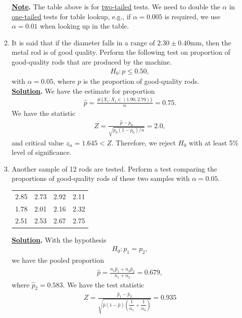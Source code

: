 \begin{enumerate}
\begin{figure}[H]
	\end{figure}
	\textbf{\underline{Note}.} The table above is for \underline{two-tailed} tests. We need to double the $\alpha$ in \underline{one-tailed} tests for table lookup, e.g., if $\alpha = 0.005$ is required, we use $\alpha = 0.01$ when looking up in the table.
	\item It is said that if the diameter falls in a range of $2.30\pm 0.40$mm, then the metal rod is of good quality. Perform the following test on proportion of good-quality rods that are produced by the machine.
	\begin{align*}
	H_0: p \leq 0.50,
	\end{align*}
	with $\alpha = 0.05$, where $p$ is the proportion of good-quality rods. \\
	\textbf{\underline{Solution}.} We have the estimate for proportion
	\begin{align*}
	\widehat{p} = \frac{\#\{X_i:X_i\in (1.90, 2.70) \}}{n} = 0.75.
	\end{align*}
	We have the statistic
	\begin{align*}
	Z = \frac{\widehat{p} - p_0}{\sqrt{p_0(1-p_0)/n}} = 2.0,
	\end{align*}
	and critical value $z_{\alpha} = 1.645 < Z$. Therefore, we reject $H_0$ with at least 5\% level of significance.
	\item Another sample of 12 rods are tested. Perform a test comparing the proportions of good-quality rods of these two samples with $\alpha = 0.05$.
	\begin{table}[H]
		\centering
		\begin{tabular}{cccc}
			2.85 & 2.73 & 2.92 & 2.11 \\
			1.78 & 2.01 & 2.16 & 2.32 \\
			2.51 & 2.53 & 2.67 & 2.75
		\end{tabular}
	\end{table}
	\textbf{\underline{Solution}.} With the hypothesis
	\begin{align*}
	H_0: p_1 = p_2,
	\end{align*}
	we have the pooled proportion
	\begin{align*}
	\widehat{p} = \frac{n_1\widehat{p}_1 + n_2\widehat{p}_2}{n_1 + n_2} = 0.679,
	\end{align*}
	where $\widehat{p}_2 = 0.583$. We have the test statistic
	\begin{align*}
	Z = \frac{\widehat{p}_1 - \widehat{p}_2}{\sqrt{\widehat{p}(1-\widehat{p})\left(\dfrac{1}{n_1} + \dfrac{1}{n_2} \right)}} = 0.935

\end{align*}
\end{enumerate}
